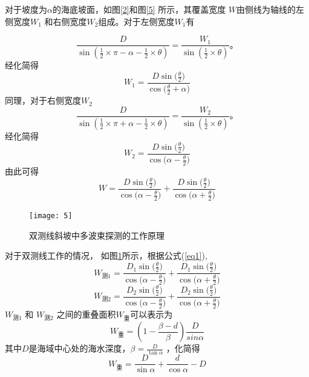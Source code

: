 \documentclass[11pt,twoside,a4paper]{article}
\begin{document}
	 对于坡度为$\alpha$的海底坡面，如图\ref{2}和图\ref{5} 所示，其覆盖宽度 $W$由侧线为轴线的左侧宽度$W_1$ 和右侧宽度$W_2$组成。对于左侧宽度$W_1$有
	
	 \begin{equation}
		\frac{D}{\sin \left(\frac{1}{2}\times \pi -\alpha-\frac{1}{2}\times \theta \right)}=\frac{W_1}{\sin( \frac{1}{2}\times \theta)} \text{。}
	 \end{equation}
	 经化简得
	 	 \begin{equation}
	  W_1=\frac{D \sin{(\frac{\theta}{2}})}{\cos{(\frac{\theta}{2}+\alpha})}
	 	\end{equation}
 	同理，对于右侧宽度$W_2$
 	 \begin{equation}
 		\frac{D}{\sin \left(\frac{1}{2}\times \pi +\alpha-\frac{1}{2}\times \theta \right)}=\frac{W_2}{\sin( \frac{1}{2}\times \theta)} \text{。}
 	\end{equation}
     经化简得
      \begin{equation}
     	W_2=\frac{D \sin{(\frac{\theta}{2}})}{\cos{(\alpha-\frac{\theta}{2}})}
     \end{equation}
    由此可得
     \begin{equation}
    	W=\frac{D \sin{(\frac{\theta}{2}})}{\cos{(\alpha-\frac{\theta}{2}})}+\frac{D \sin{(\frac{\theta}{2}})}{\cos{(\alpha+\frac{\theta}{2}})}
    	\label{eq1}
    \end{equation}
 
	
		\begin{figure}[h]
		\centering
		\texttt{[image: 5]}
		\caption{双测线斜坡中多波束探测的工作原理}
		\label{4}
	\end{figure}
对于双测线工作的情况， 如图\ref{4}所示，根据公式(\ref{eq1}),
 \begin{equation}
	W_\text{测1}=\frac{D_1 \sin{(\frac{\theta}{2}})}{\cos{(\alpha-\frac{\theta}{2}})}+\frac{D_1 \sin{(\frac{\theta}{2}})}{\cos{(\alpha+\frac{\theta}{2}})}
\end{equation}	
 \begin{equation}
	W_\text{测2}=\frac{D_2 \sin{(\frac{\theta}{2}})}{\cos{(\alpha-\frac{\theta}{2}})}+\frac{D_2 \sin{(\frac{\theta}{2}})}{\cos{(\alpha+\frac{\theta}{2}})}
\end{equation}	
	$W_\text{测1}$ 和	$W_\text{测2}$ 之间的重叠面积$W_\text{重}$可以表示为
 \begin{equation}
 W_\text{重}=(1-\frac{\beta-d}{\beta})\frac{D}{sin{\alpha}}
\end{equation}	
其中$D$是海域中心处的海水深度，$\beta=\frac{D}{\tan{\alpha}}$ ，化简得
 \begin{equation}
	W_\text{重}=\frac{D}{\sin{\alpha}}+\frac{d}{\cos{\alpha}}-D
\end{equation}
\end{document}
